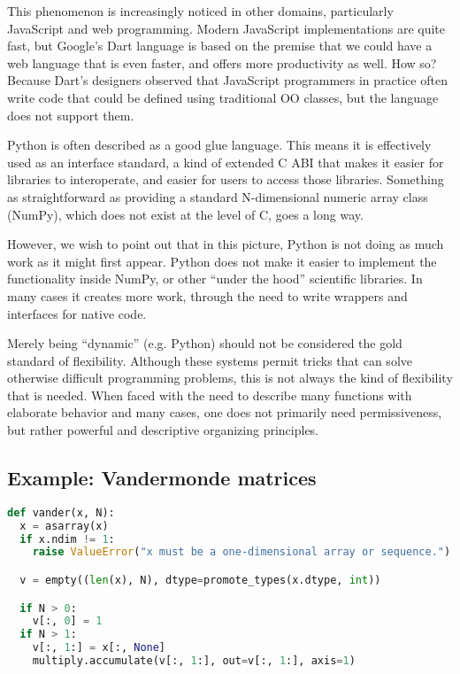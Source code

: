 {This phenomenon is increasingly noticed in other domains, particularly
JavaScript and web programming. Modern JavaScript implementations are
quite fast, but Google's Dart language is based on the premise that
we could have a web language that is even faster, and offers more
productivity as well. How so? Because Dart's designers observed that
JavaScript programmers in practice often write code that could be
defined using traditional OO classes, but the language does not
support them.

Python is often described as a good glue language. This
means it is effectively used as an interface standard, a kind of
extended C ABI that makes it easier for libraries to interoperate,
and easier for users to access those libraries. Something as straightforward
as providing a standard N-dimensional numeric array class (NumPy),
which does not exist at the level of C, goes a long way.

However, we wish to point out that in this picture, Python is not
doing as much work as it might first appear. Python does not make
it easier to implement the functionality inside NumPy, or other
``under the hood'' scientific libraries. In many cases it creates
more work, through the need to write wrappers and interfaces
for native code.

Merely being ``dynamic'' (e.g. Python) should not be considered
the gold standard of flexibility. Although these systems permit
tricks that can solve otherwise difficult programming problems,
this is not always the kind of flexibility that is needed.
When faced with the need to describe many functions with elaborate
behavior and many cases, one does not primarily need permissiveness,
but rather powerful and descriptive organizing principles.

\subsection{Example: Vandermonde matrices}

\begin{singlespace}
\begin{lstlisting}[language=python,style=ttcode]
def vander(x, N):
  x = asarray(x)
  if x.ndim != 1:
    raise ValueError("x must be a one-dimensional array or sequence.")

  v = empty((len(x), N), dtype=promote_types(x.dtype, int))

  if N > 0:
    v[:, 0] = 1
  if N > 1:
    v[:, 1:] = x[:, None]
    multiply.accumulate(v[:, 1:], out=v[:, 1:], axis=1)


\end{lstlisting}
\end{singlespace}}
